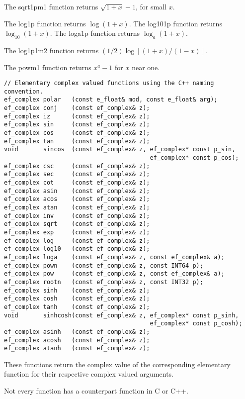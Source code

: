 \vspace{6.0pt}

 The {\courier sqrt1pm1} function returns $\sqrt{1 + x} - 1$,
for small $x$.

\vspace{6.0pt}

 The {\courier log1p} function returns $\log(1 + x)$.
The {\courier log101p} function returns $\log_{10}(1 + x)$.
The {\courier loga1p} function returns $\log_{a}(1 + x)$.

\vspace{6.0pt}

 The {\courier log1p1m2} function returns
$(1/2)\log\left[(1+x)/(1-x)\right]$.

\vspace{6.0pt}

 The {\courier powm1} function returns $x^{a} - 1$ for
$x$ near one.

\begin{lstlisting}
// Elementary complex valued functions using the C++ naming convention.
ef_complex polar   (const e_float& mod, const e_float& arg);
ef_complex conj    (const ef_complex& z);
ef_complex iz      (const ef_complex& z);
ef_complex sin     (const ef_complex& z);
ef_complex cos     (const ef_complex& z);
ef_complex tan     (const ef_complex& z);
void       sincos  (const ef_complex& z, ef_complex* const p_sin,
                                         ef_complex* const p_cos);
ef_complex csc     (const ef_complex& z);
ef_complex sec     (const ef_complex& z);
ef_complex cot     (const ef_complex& z);
ef_complex asin    (const ef_complex& z);
ef_complex acos    (const ef_complex& z);
ef_complex atan    (const ef_complex& z);
ef_complex inv     (const ef_complex& z);
ef_complex sqrt    (const ef_complex& z);
ef_complex exp     (const ef_complex& z);
ef_complex log     (const ef_complex& z);
ef_complex log10   (const ef_complex& z);
ef_complex loga    (const ef_complex& z, const ef_complex& a);
ef_complex pown    (const ef_complex& z, const INT64 p);
ef_complex pow     (const ef_complex& z, const ef_complex& a);
ef_complex rootn   (const ef_complex& z, const INT32 p);
ef_complex sinh    (const ef_complex& z);
ef_complex cosh    (const ef_complex& z);
ef_complex tanh    (const ef_complex& z);
void       sinhcosh(const ef_complex& z, ef_complex* const p_sinh,
                                         ef_complex* const p_cosh);
ef_complex asinh   (const ef_complex& z);
ef_complex acosh   (const ef_complex& z);
ef_complex atanh   (const ef_complex& z);
\end{lstlisting}

\vspace{6.0pt}

 These functions return the complex value of the corresponding
elementary function for their respective complex valued arguments.

\vspace{6.0pt}

 Not every function has a counterpart function in C or C++.

